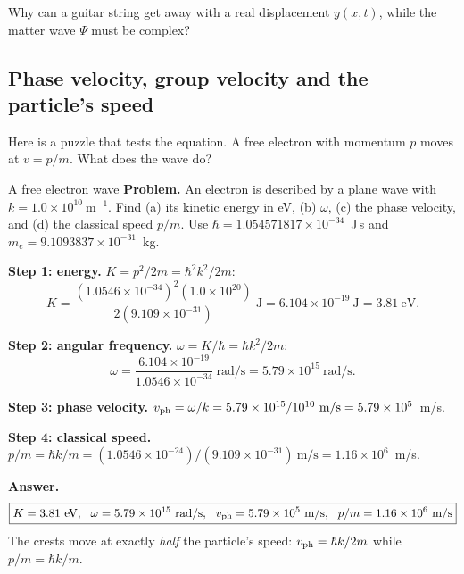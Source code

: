 \begin{checkpoint}
Why can a guitar string get away with a real displacement $y(x,t)$, while the matter wave $\Psi$ must be complex?
\end{checkpoint}

\subsection{Phase velocity, group velocity and the particle's speed}

Here is a puzzle that tests the equation. A free electron with momentum $p$ moves at $v=p/m$. What does the wave do?

\begin{sample}{A free electron wave}
\textbf{Problem.} An electron is described by a plane wave with $k=1.0\times10^{10}~\text{m}^{-1}$. Find (a) its kinetic energy in eV, (b) $\omega$, (c) the phase velocity, and (d) the classical speed $p/m$. Use $\hbar=1.054571817\times10^{-34}$~J\,s and $m_e=9.1093837\times10^{-31}$~kg.

\textbf{Step 1: energy.} $K=p^2/2m=\hbar^2k^2/2m$:
\[
K=\frac{(1.0546\times10^{-34})^2(1.0\times10^{20})}{2(9.109\times10^{-31})}~\text{J}=6.104\times10^{-19}~\text{J}=3.81~\text{eV}.
\]

\textbf{Step 2: angular frequency.} $\omega=K/\hbar=\hbar k^2/2m$:
\[
\omega=\frac{6.104\times10^{-19}}{1.0546\times10^{-34}}~\text{rad/s}=5.79\times10^{15}~\text{rad/s}.
\]

\textbf{Step 3: phase velocity.} $v_{\rm ph}=\omega/k=5.79\times10^{15}/10^{10}~\text{m/s}=5.79\times10^{5}$~m/s.

\textbf{Step 4: classical speed.} $p/m=\hbar k/m=(1.0546\times10^{-24})/(9.109\times10^{-31})~\text{m/s}=1.16\times10^6$~m/s.

\textbf{Answer.}
\[
\boxed{K=3.81~\text{eV},\ \ \omega=5.79\times10^{15}~\text{rad/s},\ \ v_{\rm ph}=5.79\times10^5~\text{m/s},\ \ p/m=1.16\times10^6~\text{m/s}}
\]
The crests move at exactly \emph{half} the particle's speed: $v_{\rm ph}=\hbar k/2m$ while $p/m=\hbar k/m$.
\end{sample}

